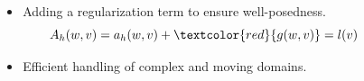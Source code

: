 \begin{frame}
\begin{columns}
\begin{column}{0.5\textwidth}
\begin{block}{}
            \end{block}
        \end{column}
        \begin{column}{0.5\textwidth}
            \begin{block}{}
                \begin{itemize}
                    \item Adding a regularization term to ensure well-posedness.
\begin{equation*}
    A_h(w,v) = a_{h}(w, v) + \textcolor{red}{g(w, v)} = l( v)
\end{equation*}
                    \item Efficient handling of complex and moving domains.
                \end{itemize}
            \end{block}
        \end{column}
    \end{columns}
\end{frame}



